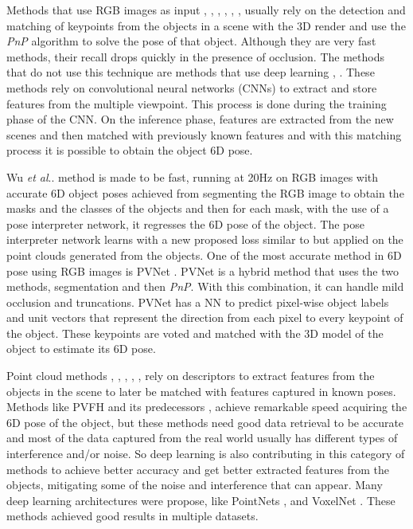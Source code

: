 \documentclass[runningheads]{llncs}
\makeatletter
\DeclareRobustCommand\onedot{\futurelet\@let@token\@onedot}
\def\@onedot{\ifx\@let@token.\else.\null\fi\xspace}
\def\etal{\emph{et al}\onedot}
\makeatother
\begin{document}
Methods that use RGB images as input \cite{pnpex1}, \cite{deepex2}, \cite{pnpex2}, \cite{pvnet}, \cite{deepex1}, \cite{pnpex3}, \cite{pnpex4} usually rely on the detection and matching of keypoints from the objects in a scene with the 3D render and use the \textit{PnP} \cite{pnp} algorithm to solve the pose of that object.
Although they are very fast methods, their recall drops quickly in the presence of occlusion.
The methods that do not use this technique are methods that use deep learning \cite{deepex2}, \cite{deepex1}.
These methods rely on convolutional neural networks (CNNs) to extract and store features from the multiple viewpoint.
This process is done during the training phase of the CNN.
On the inference phase, features are extracted from the new scenes and then matched with previously known features and with this matching process it is possible to obtain the object 6D pose.

Wu \etal \cite{wu2018real} method is made to be fast, running at 20Hz on RGB images with accurate 6D object poses achieved from segmenting the RGB image to obtain the masks and the classes of the objects and then for each mask, with the use of a pose interpreter network, it regresses the 6D pose of the object.
The pose interpreter network learns with a new proposed loss similar to  but applied on the point clouds generated from the objects.
One of the most accurate method in 6D pose using RGB images is PVNet \cite{pvnet}.
PVNet is a hybrid method that uses the two methods, segmentation and then \textit{PnP}. 
With this combination, it can handle mild occlusion and truncations.
PVNet has a NN to predict pixel-wise object labels and unit vectors that represent the direction from each pixel to every keypoint of the object. These keypoints are voted and matched with the 3D model of the object to estimate its 6D pose.

Point cloud methods \cite{pvfh}, \cite{frustum}, \cite{pointnet}, \cite{fpfh}, \cite{vfh}, \cite{voxelnet} rely on descriptors to extract features from the objects in the scene to later be matched with features captured in known poses.
Methods like PVFH \cite{pvfh} and its predecessors \cite{fpfh}, \cite{vfh} achieve remarkable speed acquiring the 6D pose of the object, but these methods need good data retrieval to be accurate and most of the data captured from the real world usually has different types of interference and/or noise.
So deep learning is also contributing in this category of methods to achieve better accuracy and get better extracted features from the objects, mitigating some of the noise and interference that can appear.
Many deep learning architectures were propose, like PointNets \cite{frustum}, \cite{pointnet} and VoxelNet \cite{voxelnet}. These methods achieved good results in multiple datasets.
\end{document}
